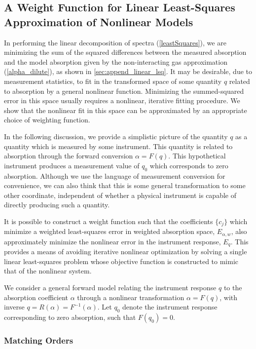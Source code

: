 \documentclass[8pt,a4paper]{report}
\begin{document}
	\subsection{A Weight Function for Linear Least-Squares Approximation of Nonlinear Models}
	
	In performing the linear decomposition of spectra (\ref{leastSquares}), we are minimizing the sum of the squared differences between the measured absorption and the model absorption given by the non-interacting gas approximation (\ref{alpha_dilute}), as shown in \ref{sec:append_linear_lsq}. It may be desirable, due to measurement statistics, to fit in the transformed space of some quantity $q$ related to absorption by a general nonlinear function. Minimizing the summed-squared error in this space usually requires a nonlinear, iterative fitting procedure. We show that the nonlinear fit in this space can be approximated by an appropriate choice of weighting function.
	
	In the following discussion, we provide a simplistic picture of the quantity $q$ as a quantity which is measured by some instrument. This quantity is related to absorption through the forward conversion $\alpha = F(q)$. This hypothetical instrument produces a measurement value of $q_0$ which corresponds to zero absorption. Although we use the language of measurement conversion for convenience, we can also think that this is some general transformation to some other coordinate, independent of whether a physical instrument is capable of directly producing such a quantity.
	
	It is possible to construct a weight function such that the coefficients $\{c_j\}$ which minimize a weighted least-squares error in weighted absorption space, $E_{\alpha,w}$, also approximately minimize the nonlinear error in the instrument response, $E_q$. This provides a means of avoiding iterative nonlinear optimization by solving a single linear least-squares problem whose objective function is constructed to mimic that of the nonlinear system.
	
	We consider a general forward model relating the instrument response $q$ to the absorption coefficient $\alpha$ through a nonlinear transformation $\alpha = F(q)$, with inverse $q = R(\alpha) = F^{-1}(\alpha)$. Let $q_0$ denote the instrument response corresponding to zero absorption, such that $F(q_0)=0$.
	
	\subsubsection{Matching Orders}
	
\end{document}
